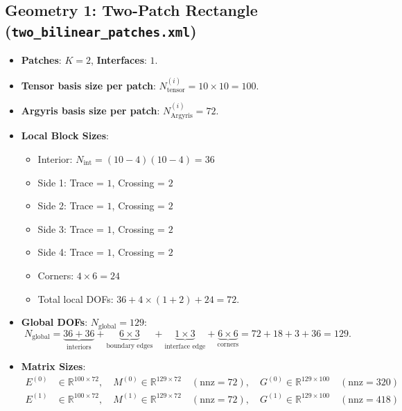 \documentclass[11pt,a4paper]{article}
\newcommand{\R}{\mathbb{R}}
\begin{document}
\subsection{Geometry 1: Two-Patch Rectangle (\texttt{two\_bilinear\_patches.xml})}
\begin{itemize}
    \item \textbf{Patches}: $K = 2$, \textbf{Interfaces}: $1$.
    \item \textbf{Tensor basis size per patch}: $N_{\text{tensor}}^{(i)} = 10 \times 10 = 100$.
    \item \textbf{Argyris basis size per patch}: $N_{\text{Argyris}}^{(i)} = 72$.
    \item \textbf{Local Block Sizes}:
    \begin{itemize}
        \item Interior: $N_{\text{int}} = (10-4)(10-4) = 36$
        \item Side 1: Trace = $1$, Crossing = $2$
        \item Side 2: Trace = $1$, Crossing = $2$
        \item Side 3: Trace = $1$, Crossing = $2$
        \item Side 4: Trace = $1$, Crossing = $2$
        \item Corners: $4 \times 6 = 24$
        \item Total local DOFs: $36 + 4 \times (1 + 2) + 24 = 72$.
    \end{itemize}
    \item \textbf{Global DOFs}: $N_{\text{global}} = 129$:
    \begin{equation}
        N_{\text{global}} = \underbrace{36 + 36}_{\text{interiors}} + \underbrace{6 \times 3}_{\text{boundary edges}} + \underbrace{1 \times 3}_{\text{interface edge}} + \underbrace{6 \times 6}_{\text{corners}} = 72 + 18 + 3 + 36 = 129.
    \end{equation}
    \item \textbf{Matrix Sizes}:
    \begin{align}
        E^{(0)} &\in \R^{100 \times 72}, \quad M^{(0)} \in \R^{129 \times 72} \quad (\text{nnz} = 72), \quad G^{(0)} \in \R^{129 \times 100} \quad (\text{nnz} = 320) \\
        E^{(1)} &\in \R^{100 \times 72}, \quad M^{(1)} \in \R^{129 \times 72} \quad (\text{nnz} = 72), \quad G^{(1)} \in \R^{129 \times 100} \quad (\text{nnz} = 418)
    \end{align}
\end{itemize}
\end{document}
